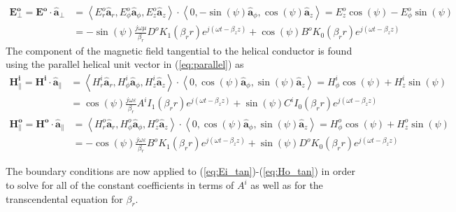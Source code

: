\begin{equation}\label{eq:Eo_norm}
	\begin{split}
		\mathbf{E_{\perp}^o} = \mathbf{E^o} \cdot \hat{\mathbf{a}}_{\perp} &= \left\langle E_r^o\hat{\mathbf{a}}_{r}, E_{\phi}^o\hat{\mathbf{a}}_{\phi}, E_z^o\hat{\mathbf{a}}_{z} \right\rangle \cdot \left\langle 0, -\sin(\psi)\hat{\mathbf{a}}_{\phi}, \cos(\psi)\hat{\mathbf{a}}_{z} \right\rangle = E_{z}^o\cos(\psi) - E_{\phi}^o\sin(\psi) \\
		&= -\sin(\psi) \frac{j \omega \mu}{\beta_r} D^o K_1(\beta_r r) e^{j(\omega t - \beta_z z)}  + \cos(\psi)B^{o}K_{0}(\beta_{r}r)e^{j(\omega t - \beta_{z}z)}
	\end{split}
\end{equation}
The component of the magnetic field tangential to the helical conductor is found using the parallel helical unit vector in (\ref{eq:parallel}) as 
\begin{equation}\label{eq:Hi_tan}
	\begin{split}
		\mathbf{H_{\parallel}^i} = \mathbf{H^i} \cdot \hat{\mathbf{a}}_{\parallel} &= \left\langle H_r^i\hat{\mathbf{a}}_{r}, H_{\phi}^i\hat{\mathbf{a}}_{\phi}, H_z^i\hat{\mathbf{a}}_{z} \right\rangle \cdot \left\langle 0, \cos(\psi)\hat{\mathbf{a}}_{\phi}, \sin(\psi)\hat{\mathbf{a}}_{z} \right\rangle = H_{\phi}^i\cos(\psi) + H_{z}^i\sin(\psi) \\
		&= \cos(\psi) \frac{j \omega \varepsilon}{\beta_r} A^i I_1(\beta_r r) e^{j(\omega t - \beta_z z)}  + \sin(\psi)C^{i}I_{0}(\beta_{r}r)e^{j(\omega t - \beta_{z}z)}
	\end{split}
\end{equation}
\begin{equation}\label{eq:Ho_tan}
	\begin{split}
		\mathbf{H_{\parallel}^o} = \mathbf{H^o} \cdot \hat{\mathbf{a}}_{\parallel} &= \left\langle H_r^o\hat{\mathbf{a}}_{r}, H_{\phi}^o\hat{\mathbf{a}}_{\phi}, H_z^o\hat{\mathbf{a}}_{z} \right\rangle \cdot \left\langle 0, \cos(\psi)\hat{\mathbf{a}}_{\phi}, \sin(\psi)\hat{\mathbf{a}}_{z} \right\rangle = H_{\phi}^o\cos(\psi) + H_{z}^o\sin(\psi) \\
		&= - \cos(\psi) \frac{j \omega \varepsilon}{\beta_r} B^o K_1(\beta_r r) e^{j(\omega t - \beta_z z)}  + \sin(\psi)D^{o}K_{0}(\beta_{r}r)e^{j(\omega t - \beta_{z}z)}
	\end{split}
\end{equation}

The boundary conditions are now applied to (\ref{eq:Ei_tan})-(\ref{eq:Ho_tan}) in order to solve for all of the constant coefficients in terms of $A^i$ as well as for the transcendental equation for $\beta_r$.

